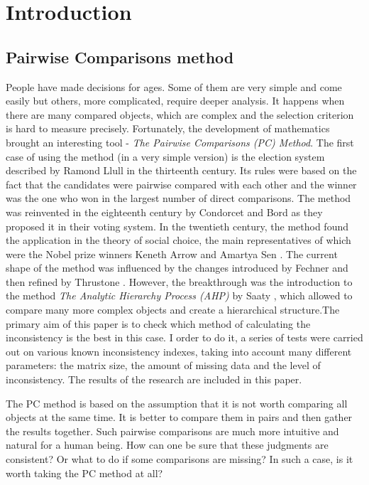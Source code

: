 \chapter{Introduction}
\label{cha:wprowadzenie}

\section{Pairwise Comparisons method}
\label{sec:metodaPorowan}
People have made decisions for ages. Some of them are very simple and come easily but others, more complicated, require deeper analysis. It happens when there are many compared objects, which are complex and the selection criterion is hard to measure precisely. Fortunately, the development of mathematics brought an interesting tool - \textit{The Pairwise Comparisons (PC) Method}. The first case of using the method (in a very simple version) is the election system described by Ramond Llull \cite{Colomer2013} in the thirteenth century. Its rules were based on the fact that the candidates were pairwise compared with each other and the winner was the one who won in the largest number of direct comparisons. The method was reinvented in the eighteenth century by Condorcet and Bord \cite{Kulakowski2016} as they proposed it in their voting system. In the twentieth century, the method found the application in the theory of social choice, the main representatives of which were the Nobel prize winners Keneth Arrow \cite{Arrow} and Amartya Sen \cite{Sen}. The current shape of the method was influenced by the changes introduced by Fechner \cite{Fechner1966} and then refined by {Thrustone} \cite{Thurstone1994}. However, the breakthrough was the introduction to the method \textit\textit{The Analytic Hierarchy Process (AHP)} by Saaty \cite{Saaty2008}, which allowed to compare many more complex objects and create a hierarchical structure.The primary aim of this paper is to check which method of calculating the inconsistency is the best in this case. I order to do it, a series of tests were carried out on various known inconsistency indexes, taking into account many different parameters: the matrix size, the amount of missing data and the level of inconsistency. The results of the research are included in this paper.

The PC method is based on the assumption that it is not worth comparing all objects at the same time. It is better to compare them in pairs and then gather the results together. Such pairwise comparisons are much more intuitive and natural for a human being. How can one be sure that these judgments are consistent? Or what to do if some comparisons are missing? In such a case, is it worth taking the PC method at all?

